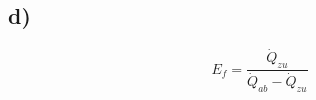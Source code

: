 

\subsection*{d)}
\begin{equation*}
    E_f = \frac{\dot{Q}_{zu}}{\dot{Q}_{ab} - \dot{Q}_{zu}}
\end{equation*}